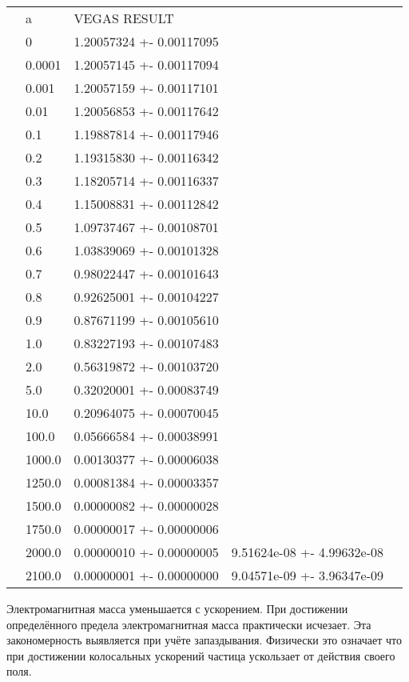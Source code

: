 \documentclass{article}
\begin{document}
\begin{table}[]
\begin{tabular}{lllll}
 & a      & VEGAS RESULT             &  &  \\
 & 0      & 1.20057324 +- 0.00117095 &  &  \\
 & 0.0001 & 1.20057145 +- 0.00117094 &  &  \\
 & 0.001  & 1.20057159 +- 0.00117101 &  &  \\
 & 0.01   & 1.20056853 +- 0.00117642 &  &  \\
 & 0.1    & 1.19887814 +- 0.00117946 &  &  \\
 & 0.2    & 1.19315830 +- 0.00116342 &  &  \\
 & 0.3    & 1.18205714 +- 0.00116337 &  &  \\
 & 0.4    & 1.15008831 +- 0.00112842 &  &  \\
 & 0.5    & 1.09737467 +- 0.00108701 &  &  \\
 & 0.6    & 1.03839069 +- 0.00101328 &  &  \\
 & 0.7    & 0.98022447 +- 0.00101643 &  &  \\
 & 0.8    & 0.92625001 +- 0.00104227 &  &  \\
 & 0.9    & 0.87671199 +- 0.00105610 &  &  \\
 & 1.0    & 0.83227193 +- 0.00107483 &  &  \\
 & 2.0    & 0.56319872 +- 0.00103720 &  &  \\
 & 5.0    & 0.32020001 +- 0.00083749 &  &  \\
 & 10.0   & 0.20964075 +- 0.00070045 &  &  \\
 & 100.0  & 0.05666584 +- 0.00038991 &  &  \\
 & 1000.0 & 0.00130377 +- 0.00006038 &  &  \\
 & 1250.0 & 0.00081384 +- 0.00003357 &  &  \\
 & 1500.0 & 0.00000082 +- 0.00000028 &  &  \\
 & 1750.0 & 0.00000017 +- 0.00000006 &  &  \\
 & 2000.0 & 0.00000010 +- 0.00000005 & 9.51624e-08 +- 4.99632e-08 &  \\
 & 2100.0 & 0.00000001 +- 0.00000000 & 9.04571e-09 +- 3.96347e-09 &  \\
\end{tabular}
\end{table}

Электромагнитная масса уменьшается с ускорением. При достижении определённого предела электромагнитная масса практически исчезает. Эта закономерность выявляется при учёте запаздывания. Физически это означает что при достижении колосальных ускорений частица ускользает от действия своего поля.
\end{document}
